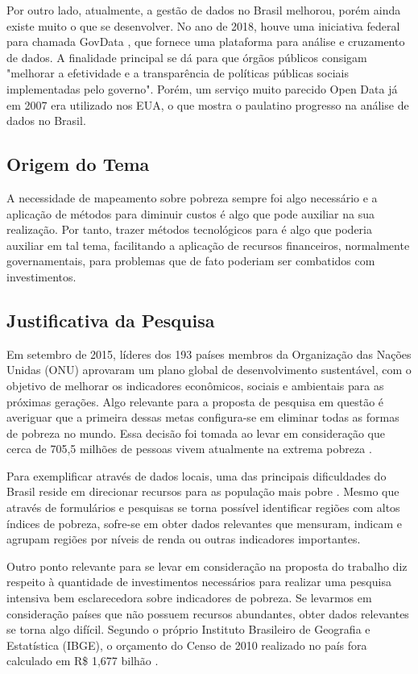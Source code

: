 \documentclass[]{article}
\begin{document}
Por outro lado, atualmente, a gestão de dados no Brasil melhorou, porém ainda existe muito o que se desenvolver. No ano de 2018, houve uma iniciativa federal para chamada GovData \cite{ref_govdata}, que fornece uma plataforma para análise e cruzamento de dados. A finalidade principal se dá para que órgãos públicos consigam "melhorar a efetividade e a transparência de políticas públicas sociais implementadas pelo governo". Porém, um serviço muito parecido Open Data \cite{ref_opendata} já em 2007 era utilizado nos EUA, o que mostra o paulatino progresso na análise de dados no Brasil.

\subsection{Origem do Tema}
A necessidade de mapeamento sobre pobreza sempre foi algo necessário e a aplicação de métodos para diminuir custos é algo que pode auxiliar na sua realização. Por tanto, trazer métodos tecnológicos para é algo que poderia auxiliar em tal tema, facilitando a aplicação de recursos financeiros, normalmente governamentais, para problemas que de fato poderiam ser combatidos com investimentos.

\subsection{Justificativa da Pesquisa}
Em setembro de 2015, líderes dos 193 países membros da Organização das Nações Unidas (ONU) aprovaram um plano global de desenvolvimento sustentável, com o objetivo de melhorar os indicadores econômicos, sociais e ambientais para as próximas gerações\cite{ref_nacoes}. Algo relevante para a proposta de pesquisa em questão é averiguar que a primeira dessas metas configura-se em eliminar todas as formas de pobreza no mundo. Essa decisão foi tomada ao levar em consideração que cerca de 705,5 milhões de pessoas vivem atualmente na extrema pobreza \cite{ref_extrema_pobreza}. 

Para exemplificar através de dados locais, uma das principais dificuldades do Brasil reside em direcionar recursos para as população mais pobre \cite{ref_lazarotto}. Mesmo que através de formulários e pesquisas se torna possível identificar regiões com altos índices de pobreza, sofre-se em obter dados relevantes que mensuram, indicam e agrupam regiões por níveis de renda ou outras indicadores importantes.

Outro ponto relevante para se levar em consideração na proposta do trabalho diz respeito à quantidade de investimentos necessários para realizar uma pesquisa intensiva bem esclarecedora sobre indicadores de pobreza. Se levarmos em consideração países que não possuem recursos abundantes, obter dados relevantes se torna algo difícil. Segundo o próprio Instituto Brasileiro de Geografia e Estatística (IBGE), o orçamento do Censo de 2010 realizado no país fora calculado em R\$ 1,677 bilhão \cite{ref_IBGE}.
\end{document}
